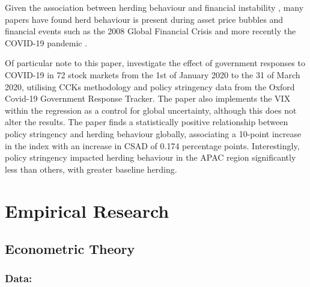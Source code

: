 \documentclass[12pt]{article}
\numberwithin{table}{section}   %
\begin{document}
Given the association between herding behaviour and financial instability \citep{avery}, many papers have found herd behaviour is present during asset price bubbles \citep{BEKIROS} and financial events such as the 2008 Global Financial Crisis \citep{chang2020herding, chiangzheng} and more recently the COVID-19 pandemic \citep{wu, yarovaya2021effects}.

Of particular note to this paper, \citet{kizys} investigate the effect of government responses to COVID-19 in 72 stock markets from the 1st of January 2020 to the 31 of March 2020, utilising CCKs methodology and policy stringency data from the Oxford Covid-19 Government Response Tracker. The paper also implements the VIX within the regression as a control for global uncertainty, although this does not alter the results. The paper finds a statistically positive relationship between policy stringency and herding behaviour globally, associating a 10-point increase in the index with an increase in CSAD of 0.174 percentage points. Interestingly, policy stringency impacted herding behaviour in the APAC region significantly less than others, with greater baseline herding.

\section{Empirical Research}

\subsection{Econometric Theory}

\subsubsection*{Data:}
\end{document}
